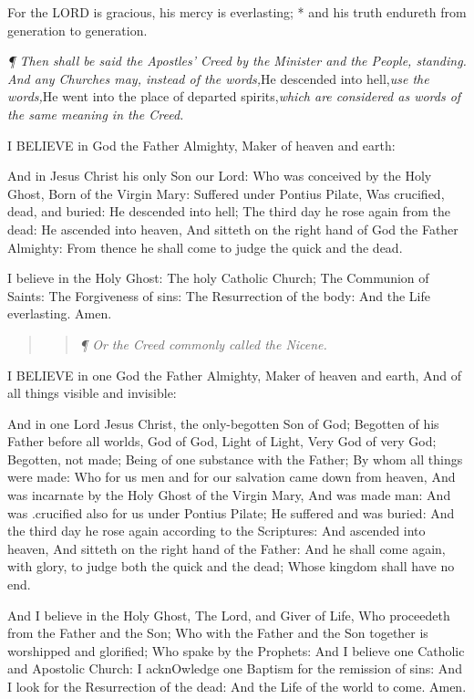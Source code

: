 For the LORD is gracious, his
mercy is everlasting; * and his truth endureth from generation to generation.

\emph{¶
Then shall be said the Apostles’ Creed by the Minister and the People,
standing. And any Churches may, instead of the words,}He descended
into hell,\emph{use the words,}He went into the place of departed
spirits,\emph{which are considered as words of the same meaning in the
Creed.}

I
BELIEVE in God the Father Almighty, Maker of heaven and earth:

And in Jesus Christ his only Son our Lord: Who was
conceived by the Holy Ghost, Born of the Virgin Mary: Suffered under Pontius
Pilate, Was crucified, dead, and buried: He descended into hell; The third
day he rose again from the dead: He ascended into heaven, And sitteth
on the right hand of God the Father Almighty: From thence he shall come
to judge the quick and the dead.

I believe in the Holy Ghost: The holy Catholic Church;
The Communion of Saints: The Forgiveness of sins: The Resurrection of
the body: And the Life everlasting. Amen.

\begin{quote}

\begin{quote}

\emph{¶ Or the Creed commonly called the Nicene.}

\end{quote}

\end{quote}

I
BELIEVE in one God the Father Almighty, Maker of heaven and earth, And
of all things visible and invisible:

And in one Lord Jesus Christ, the only-begotten Son
of God; Begotten of his Father before all worlds, God of God, Light of
Light, Very God of very God; Begotten, not made; Being of one substance
with the Father; By whom all things were made: Who for us men and for
our salvation came down from heaven, And was incarnate by the Holy Ghost
of the Virgin Mary, And was made man: And was .crucified also for us under
Pontius Pilate; He suffered and was buried: And the third day he rose
again according to the Scriptures: And ascended into heaven, And sitteth
on the right hand of the Father: And he shall come again, with glory,
to judge both the quick and the dead; Whose kingdom shall have no end.

And I believe in the Holy Ghost, The Lord, and Giver
of Life, Who proceedeth from the Father and the Son; Who with the Father
and the Son together is worshipped and glorified; Who spake by the Prophets:
And I believe one Catholic and Apostolic Church: I acknOwledge one Baptism
for the remission of sins: And I look for the Resurrection of the dead:
And the Life of the world to come. Amen.


